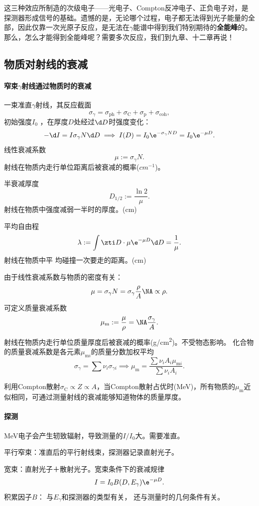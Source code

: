 这三种效应所制造的次级电子——光电子、Compton反冲电子、正负电子对，是探测器形成信号的基础。遗憾的是，无论哪个过程，电子都无法得到光子能量的全部，因此仅靠一次光原子反应，是无法在$\gamma$能谱中得到我们特别期待的\textbf{全能峰}的。
那么，怎么才能得到全能峰呢？需要多次反应，我们到九章、十二章再说！

\subsection{物质对\textgamma 射线的衰减}

\paragraph{窄束$\gamma$射线通过物质时的衰减}
一束准直$\gamma$射线，其反应截面
\[
	\sigma_\gamma=\sigma_{\mathrm{ph}}+\sigma_{\mathrm C}+\sigma_{\mathrm p}+\sigma_{\mathrm{coh}},
\]
初始强度$I_0$ ，在厚度$D$处经过$\d D$时强度变化：
\[
	-\d I=I\sigma_\gamma N\d D\implies I(D)=I_0\e^{-\sigma_\gamma ND}=I_0\e^{-\mu D}.
\]
线性衰减系数
\[
	\mu:=\sigma_\gamma N.
\]
射线在物质内走行单位距离后被衰减的概率($\si{cm^{-1}}$)。

半衰减厚度
\[
	D_{1/2}:=\frac{\ln 2}\mu.
\]
射线在物质中强度减弱一半时的厚度。(cm)


平均自由程
\[
	\lambda:=\int\zti D\cdot\mu \e^{-\mu D}\d D=\frac1\mu.
\]
射线在物质中平
均碰撞一次要走的距离。(cm)

由于线性衰减系数与物质的密度有关：
\[
	\mu=\sigma_\gamma N=\sigma_\gamma\frac\rho{A}\NA\propto\rho.
\]
可定义质量衰减系数
\begin{align}
	\mu_\mathrm m:=\frac\mu\rho=\NA\frac{\sigma_\gamma}A.
\end{align}
射线在物质内走行单位质量厚度后被衰减的概率(\si{g/cm^2})。不受物态影响。
化合物的质量衰减系数是各元素$\mu_{\mathrm mi}$的质量分数加权平均
\[
	\sigma_\gamma=\sum\nu_i\sigma_{\gamma i}\implies\mu_\mathrm m=\frac{\sum\nu_iA_i\mu_{\mathrm mi}}{\sum\nu_iA_i}.
\]

利用Compton散射$\sigma_\mathrm C\propto Z\propto A$，当Compton散射占优时(MeV)，所有物质的$\mu_\mathrm m$近似相同，可通过测量射线的衰减能够知道物体的质量厚度。

\paragraph{探测}
MeV电子会产生轫致辐射，导致测量的$I/I_0$大。需要准直。

平行窄束：准直后的平行射线束，探测器记录直射光子。

宽束：直射光子＋散射光子。宽束条件下的衰减规律
\[
	I=I_0B(D,E_\gamma)\e^{-\mu D}.
\]
积累因子$B$：
与$E_\gamma$和探测器的类型有关，
还与测量时的几何条件有关。



